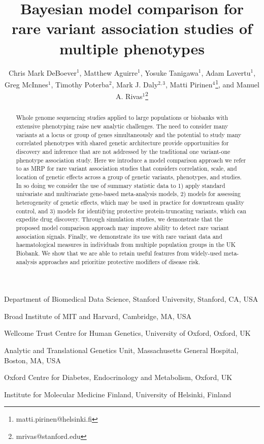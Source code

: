 \documentclass{nature}
\title{Bayesian model comparison for rare variant association studies of multiple phenotypes}
\author{Chris Mark DeBoever$^{1}$, Matthew Aguirre$^{1}$, Yosuke Tanigawa$^{1}$, Adam Lavertu$^{1}$, Greg McInnes$^{1}$, Timothy Poterba$^{2}$, Mark J. Daly$^{2,3}$,  Matti Pirinen$^{4}$\thanks{matti.pirinen@helsinki.fi}, and Manuel A. Rivas$^{1}$\thanks{mrivas@stanford.edu}}
\begin{document}
\maketitle
\begin{abstract}
\singlespacing
Whole genome sequencing studies applied to large populations or biobanks with extensive phenotyping raise new analytic challenges. The need to consider many variants at a locus or group of genes simultaneously and the potential to study many correlated phenotypes with shared genetic architecture provide opportunities for discovery and inference that are not addressed by the traditional one variant-one phenotype association study. Here we introduce a model comparison approach we refer to as MRP for rare variant association studies that considers correlation, scale, and location of genetic effects across a group of genetic variants, phenotypes, and studies. In so doing we consider the use of summary statistic data to 1) apply standard univariate and multivariate gene-based meta-analysis models, 2) models for assessing heterogeneity of genetic effects, which may be used in practice for downstream quality control, and 3) models for identifying protective protein-truncating variants, which can expedite drug discovery.  Through simulation studies, we demonstrate that the proposed model comparison approach may improve ability to detect rare variant association signals. Finally, we demonstrate its use with rare variant data and haematological measures in individuals from multiple population groups in the UK Biobank. We show that we are able to retain useful features from widely-used meta-analysis approaches and prioritize protective modifiers of disease risk.
\end{abstract}

\begin{affiliations}
\item Department of Biomedical Data Science, Stanford University, Stanford, CA, USA
\item Broad Institute of MIT and Harvard, Cambridge, MA, USA
\item Wellcome Trust Centre for Human Genetics, University of Oxford, Oxford, UK
\item Analytic and Translational Genetics Unit, Massachusetts General Hospital, Boston, MA, USA
\item Oxford Centre for Diabetes, Endocrinology and Metabolism, Oxford, UK
\item Institute for Molecular Medicine Finland, University of Helsinki, Finland
\end{affiliations}
\newpage
\end{document}
